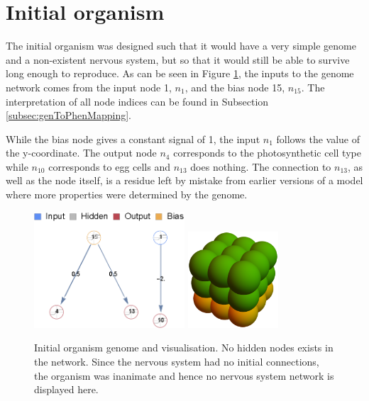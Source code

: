 \section{Initial organism}\label{sec:initOrg}
The initial organism was designed such that it would have a very simple genome and a non-existent nervous system, but so that it would still be able to survive long enough to reproduce. As can be seen in Figure \ref{fig:initOrg}, the inputs to the genome network comes from the input node 1, \(n_1\), and the bias node 15, \(n_{15}\). The interpretation of all node indices can be found in Subsection \ref{subsec:genToPhenMapping}.

While the bias node gives a constant signal of 1, the input \(n_1\) follows the value of the y-coordinate. The output node \(n_4\) corresponds to the photosynthetic cell type while \(n_{10}\) corresponds to egg cells and \(n_{13}\) does nothing. The connection to \(n_{13}\), as well as the node itself, is a residue left by mistake from earlier versions of a model where more properties were determined by the genome.

\begin{figure}
  \begin{center}
  \includegraphics[width=0.5\textwidth]{"figure/org0 genome"}
  \includegraphics[width=0.3\textwidth]{figure/org0}
  \caption{
    Initial organism genome and visualisation. No hidden nodes exists in the network. Since the nervous system had no initial connections, the organism was inanimate and hence no nervous system network is displayed here.  
  }
  \label{fig:initOrg}
  \end{center}
\end{figure}

